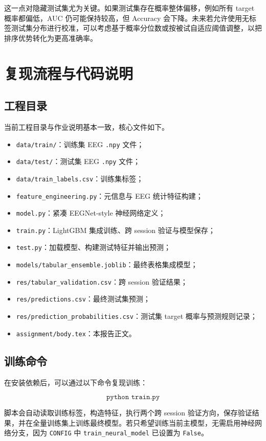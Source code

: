 这一点对隐藏测试集尤为关键。如果测试集存在概率整体偏移，例如所有 target 概率都偏低，AUC 仍可能保持较高，但 Accuracy 会下降。未来若允许使用无标签测试集分布进行校准，可以考虑基于概率分位数或按被试自适应阈值调整，以把排序优势转化为更高准确率。

\chapter{复现流程与代码说明}

\section{工程目录}

当前工程目录与作业说明基本一致，核心文件如下。

\begin{itemize}
  \item \texttt{data/train/}：训练集 EEG \texttt{.npy} 文件；
  \item \texttt{data/test/}：测试集 EEG \texttt{.npy} 文件；
  \item \texttt{data/train\_labels.csv}：训练集标签；
  \item \texttt{feature\_engineering.py}：元信息与 EEG 统计特征构建；
  \item \texttt{model.py}：紧凑 EEGNet-style 神经网络定义；
  \item \texttt{train.py}：LightGBM 集成训练、跨 session 验证与模型保存；
  \item \texttt{test.py}：加载模型、构建测试特征并输出预测；
  \item \texttt{models/tabular\_ensemble.joblib}：最终表格集成模型；
  \item \texttt{res/tabular\_validation.csv}：跨 session 验证结果；
  \item \texttt{res/predictions.csv}：最终测试集预测；
  \item \texttt{res/prediction\_probabilities.csv}：测试集 target 概率与预测规则记录；
  \item \texttt{assignment/body.tex}：本报告正文。
\end{itemize}

\section{训练命令}

在安装依赖后，可以通过以下命令复现训练：

\[
\texttt{python train.py}
\]

脚本会自动读取训练标签，构造特征，执行两个跨 session 验证方向，保存验证结果，并在全量训练集上训练最终模型。若只希望训练当前主模型，无需启用神经网络分支，因为 \texttt{CONFIG} 中 \texttt{train\_neural\_model} 已设置为 \texttt{False}。

